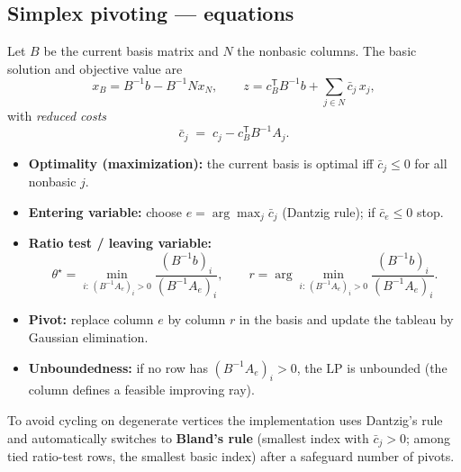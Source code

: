 \documentclass[10pt]{article}
\begin{document}
\subsection{Simplex pivoting --- equations}
Let $B$ be the current basis matrix and $N$ the nonbasic columns.
The basic solution and objective value are
\begin{equation}
x_B = B^{-1} b - B^{-1} N x_N, \qquad
z = c_B^{\mathsf T} B^{-1} b + \sum_{j\in N} \bar{c}_j\, x_j,
\end{equation}
with \emph{reduced costs}
\begin{equation}
\label{eq:rc}
\bar{c}_j \;=\; c_j - c_B^{\mathsf T} B^{-1} A_j .
\end{equation}
\begin{itemize}[nosep]
  \item \textbf{Optimality (maximization):} the current basis is optimal iff
        $\bar{c}_j \le 0$ for all nonbasic $j$.
  \item \textbf{Entering variable:} choose $e = \arg\max_j \bar{c}_j$
        (Dantzig rule); if $\bar{c}_e \le 0$ stop.
  \item \textbf{Ratio test / leaving variable:}
        \begin{equation}
        \theta^\star = \min_{i:\, (B^{-1}A_e)_i > 0}
        \frac{(B^{-1}b)_i}{(B^{-1}A_e)_i}, \qquad
        r = \arg\min_{i:\, (B^{-1}A_e)_i > 0}
        \frac{(B^{-1}b)_i}{(B^{-1}A_e)_i}.
        \end{equation}
  \item \textbf{Pivot:} replace column $e$ by column $r$ in the basis and
        update the tableau by Gaussian elimination.
  \item \textbf{Unboundedness:} if no row has $(B^{-1}A_e)_i > 0$, the LP is
        unbounded (the column defines a feasible improving ray).
\end{itemize}
To avoid cycling on degenerate vertices the implementation uses Dantzig's
rule and automatically switches to \textbf{Bland's rule} (smallest index
with $\bar{c}_j > 0$; among tied ratio-test rows, the smallest basic index)
after a safeguard number of pivots.
\end{document}
